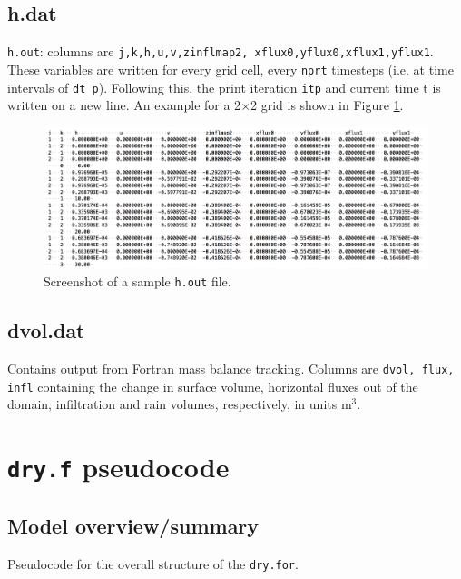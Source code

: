 \documentclass{article}
\newcommand{\code}[1]{\texttt{#1}}
\begin{document}
\subsection{h.dat}

\code{h.out}: columns are \code{j,k,h,u,v,zinflmap2, xflux0,yflux0,xflux1,yflux1}. 
These variables are written for every grid cell, every \code{nprt} timesteps (i.e. at time intervals of \code{dt\_p}). Following this, the print iteration \code{itp} and current time {t} is written on a new line. An example for a 2$\times$2 grid is shown in Figure \ref{h.out_example}.  

 \begin{figure}[h]
 \centering
\includegraphics[width=35pc]{grid/h_out.png}
 \caption{Screenshot of a sample \code{h.out} file.}
 \label{h.out_example}
 \end{figure}
  
  


\subsection{dvol.dat}

Contains output from Fortran mass balance tracking.
Columns are \code{dvol, flux, infl} containing the  change in surface volume, horizontal fluxes out of the domain, infiltration and rain volumes, respectively, in units m$^3$.


\section{\code{dry.f} pseudocode}

\subsection{Model overview/summary}

 Pseudocode for the overall structure of the \code{dry.for}.
\end{document}
